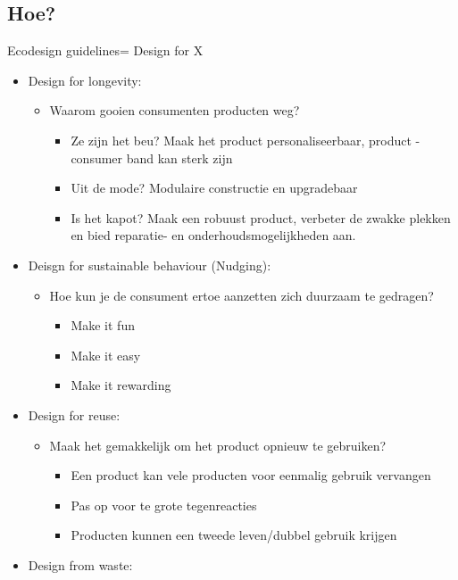 \documentclass[12pt]{article}
\begin{document}
\subsection{Hoe?}
Ecodesign guidelines= Design for X 
\begin{itemize}
    \item Design for longevity:\begin{itemize}
        \item Waarom gooien consumenten producten weg?\begin{itemize}
            \item Ze zijn het beu? Maak het product personaliseerbaar, product - consumer band kan sterk zijn 
            \item Uit de mode? Modulaire constructie en upgradebaar  
            \item Is het kapot? Maak een robuust product, verbeter de zwakke plekken en bied reparatie- en onderhoudsmogelijkheden aan.
        \end{itemize}
    \end{itemize}
    \item Deisgn for sustainable behaviour (Nudging):\begin{itemize}
        \item Hoe kun je de consument ertoe aanzetten zich duurzaam te gedragen?\begin{itemize}
            \item Make it fun 
            \item Make it easy 
            \item Make it rewarding
        \end{itemize}
    \end{itemize}
    \item Design for reuse:\begin{itemize}
        \item Maak het gemakkelijk om het product opnieuw te gebruiken?\begin{itemize}
            \item Een product kan vele producten voor eenmalig gebruik vervangen 
            \item Pas op voor te grote tegenreacties 
            \item Producten kunnen een tweede leven/dubbel gebruik krijgen 
        \end{itemize}
    \end{itemize}
    \item Design from waste:\begin{itemize}

\end{itemize}
\end{itemize}
\end{document}
